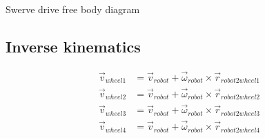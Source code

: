 \begin{bookfigure}

  \caption{Swerve drive free body diagram}
  \label{fig:swerve_drive_fbd}
\end{bookfigure}

\subsection{Inverse kinematics}
\begin{align*}
  \vec{v}_{wheel1} &= \vec{v}_{robot} + \vec{\omega}_{robot} \times
    \vec{r}_{robot2wheel1} \\
  \vec{v}_{wheel2} &= \vec{v}_{robot} + \vec{\omega}_{robot} \times
    \vec{r}_{robot2wheel2} \\
  \vec{v}_{wheel3} &= \vec{v}_{robot} + \vec{\omega}_{robot} \times
    \vec{r}_{robot2wheel3} \\
  \vec{v}_{wheel4} &= \vec{v}_{robot} + \vec{\omega}_{robot} \times
    \vec{r}_{robot2wheel4}
\end{align*}

